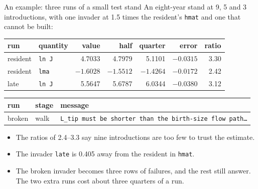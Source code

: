\documentclass[aspectratio=169,10pt]{beamer}
\begin{document}
\begin{frame}{An example: three runs of a small test stand}
  \small
  An eight-year stand at 9, 5 and 3 introductions, with one invader at 1.5 times the resident's
  \texttt{hmat} and one that cannot be built:
  \medskip

  \footnotesize
  \begin{tabular}{@{}llrrrrr@{}}
    \toprule
    run & quantity & value & half & quarter & error & ratio \\
    \midrule
    resident & \texttt{ln J} & 4.7033 & 4.7979 & 5.1101 & $-0.0315$ & 3.30 \\
    resident & \texttt{lma} & $-1.6028$ & $-1.5512$ & $-1.4264$ & $-0.0172$ & 2.42 \\
    late & \texttt{ln J} & 5.5647 & 5.6787 & 6.0344 & $-0.0380$ & 3.12 \\
    \bottomrule
  \end{tabular}
  \par\smallskip
  \begin{tabular}{@{}lll@{}}
    \toprule
    run & stage & message \\
    \midrule
    broken & walk & \texttt{L\_tip must be shorter than the birth-size flow path\ldots} \\
    \bottomrule
  \end{tabular}
  \medskip

  \small
  \begin{itemize}
    \item The ratios of 2.4--3.3 say nine introductions are too few to trust the estimate.
    \item The invader \texttt{late} is 0.405 away from the resident in \texttt{hmat}.
    \item The broken invader becomes three rows of failures, and the rest still answer. The two
      extra runs cost about three quarters of a run.
  \end{itemize}
\end{frame}
\end{document}
